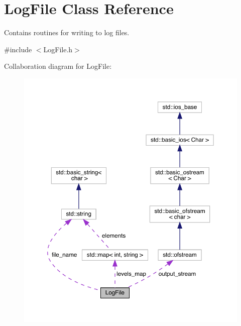 \hypertarget{class_log_file}{}\section{Log\+File Class Reference}
\label{class_log_file}


Contains routines for writing to log files.  




{\ttfamily \#include $<$Log\+File.\+h$>$}



Collaboration diagram for Log\+File\+:\nopagebreak
\begin{figure}[H]
\begin{center}
\leavevmode
\includegraphics[width=350pt]{class_log_file__coll__graph}
\end{center}
\end{figure}
